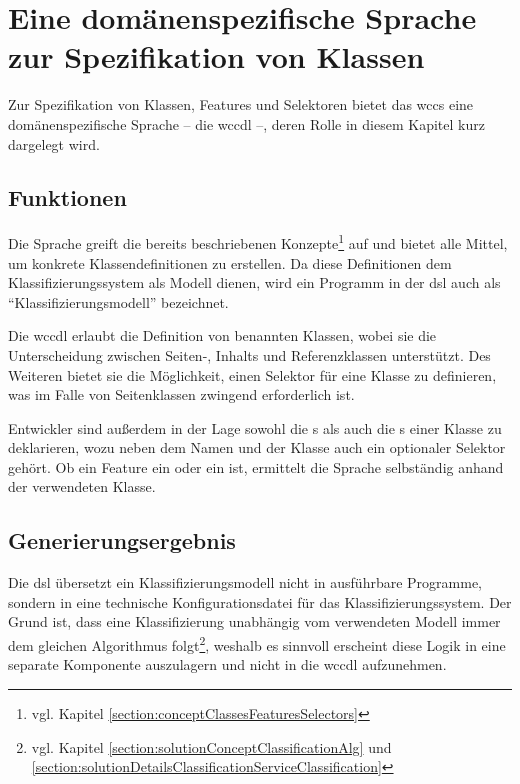 \section{Eine domänenspezifische Sprache zur Spezifikation von Klassen}
    Zur Spezifikation von Klassen, Features und Selektoren bietet das
    \gls{wccs} eine domänenspezifische Sprache
    -- die \gls{wccdl} --,
    deren Rolle in diesem Kapitel kurz dargelegt wird.

    \subsection{Funktionen}
        Die Sprache greift die bereits beschriebenen
        Konzepte\footnote{vgl. Kapitel \ref{section:conceptClassesFeaturesSelectors}}
        auf und bietet alle Mittel, um konkrete Klassendefinitionen zu erstellen.
        Da diese Definitionen dem Klassifizierungssystem als Modell dienen,
        wird ein Programm in der \gls{dsl} auch als "`Klassifizierungsmodell"' bezeichnet.

        Die \gls{wccdl} erlaubt die Definition von benannten Klassen,
        wobei sie die Unterscheidung zwischen Seiten-, Inhalts und Referenzklassen unterstützt.
        Des Weiteren bietet sie die Möglichkeit, einen Selektor für eine Klasse zu definieren,
        was im Falle von Seitenklassen zwingend erforderlich ist.

        Entwickler sind außerdem in der Lage sowohl die {\scalarFeature}s
        als auch die {\collectionFeature}s einer Klasse zu deklarieren,
        wozu neben dem Namen und der Klasse auch ein optionaler Selektor gehört.
        Ob ein Feature ein {\contentFeature} oder ein {\collectionFeature} ist,
        ermittelt die Sprache selbständig anhand der verwendeten Klasse.

    \subsection{Generierungsergebnis}
        \label{section:conceptDslGeneration}
        Die \gls{dsl} übersetzt ein Klassifizierungsmodell nicht in ausführbare Programme,
        sondern in eine technische Konfigurationsdatei für das Klassifizierungssystem.
        Der Grund ist, dass eine Klassifizierung unabhängig vom verwendeten Modell immer
        dem gleichen Algorithmus
        folgt\footnote{vgl. Kapitel \ref{section:solutionConceptClassificationAlg}
        und \ref{section:solutionDetailsClassificationServiceClassification}},
        weshalb es sinnvoll erscheint diese Logik in eine separate Komponente auszulagern
        und nicht in die \gls{wccdl} aufzunehmen.

